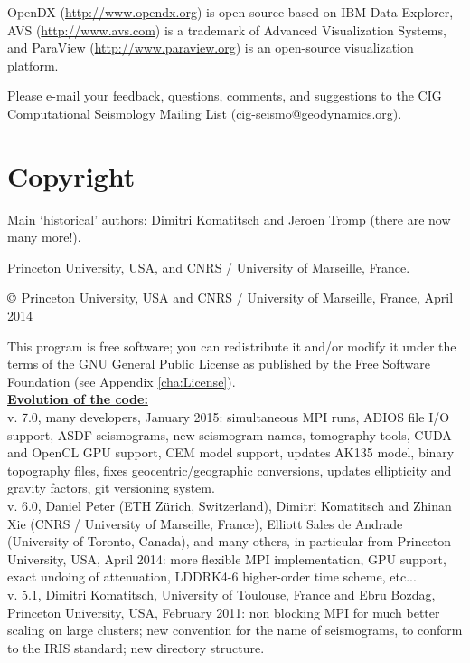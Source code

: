 \documentclass[oneside,english]{book}
\newcommand{\urlwithparentheses}[1]{(\url{#1})}
\begin{document}
OpenDX \urlwithparentheses{http://www.opendx.org} is open-source based on IBM Data Explorer,
AVS \urlwithparentheses{http://www.avs.com} is a trademark of Advanced Visualization Systems,
and ParaView \urlwithparentheses{http://www.paraview.org} is an open-source visualization
platform.{\small{} }{\small \par}

Please e-mail your feedback, questions, comments, and suggestions
to the CIG Computational Seismology Mailing List \urlwithparentheses{cig-seismo@geodynamics.org}.


\chapter*{\label{cha:Copyright}Copyright}

Main `historical' authors: Dimitri Komatitsch and Jeroen Tromp (there are now many more!).

Princeton University, USA, and CNRS / University of Marseille, France.

$\copyright$ Princeton University, USA and CNRS / University of Marseille, France, April 2014

This program is free software; you can redistribute it and/or modify
it under the terms of the GNU General Public License as published
by the Free Software Foundation (see Appendix \ref{cha:License}).\\

\textbf{\underline{Evolution of the code:}}\\

 v. 7.0, many developers, January 2015:
     simultaneous MPI runs, ADIOS file I/O support, ASDF seismograms, new seismogram names, tomography tools,
     CUDA and OpenCL GPU support, CEM model support, updates AK135 model, binary topography files,
     fixes geocentric/geographic conversions, updates ellipticity and gravity factors, git versioning system.\\

 v. 6.0, Daniel Peter (ETH Z\"urich, Switzerland), Dimitri Komatitsch and Zhinan Xie (CNRS / University of Marseille, France),
     Elliott Sales de Andrade (University of Toronto, Canada), and many others, in particular from Princeton University, USA,
     April 2014:
     more flexible MPI implementation, GPU support, exact undoing of attenuation, LDDRK4-6 higher-order time scheme, etc...\\

 v. 5.1, Dimitri Komatitsch, University of Toulouse, France and Ebru Bozdag, Princeton University, USA, February 2011:
     non blocking MPI for much better scaling on large clusters;
     new convention for the name of seismograms, to conform to the IRIS standard;
     new directory structure.\\
\end{document}
